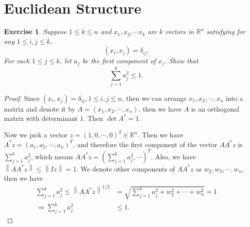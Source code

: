 \documentclass[11pt]{book}
\newtheorem{exercise}{Exercise}[section]
\theoremstyle{definition}
\numberwithin{equation}{subsection}
\begin{document}
\section{Euclidean Structure}
\begin{exercise}
Suppose $1\leq k\leq n$ and $x_{1},x_{2},\cdots x_{k}$ are $k$ vectors
in $\mathbb{R}^{n}$ satisfying for any $1\leq i,j\leq k$,%
$$
\left(  x_{i},x_{j}\right)  =\delta_{ij}.
$$
For each $1\leq j\leq k$, let $a_{j}$ be the first component of $x_{j}$. Show
that%
$$
\sum_{j=1}^{k}a_{j}^{2}\leq1.
$$
\end{exercise}
\begin{proof}
Since $(x_i,x_j) = \delta_{ij}, 1\leq i,j\leq n$, then we can arrange $x_1, x_2,\cdots, x_n$ into a matrix and denote it by $A = (x_1, x_2,\cdots, x_n)$, then we have $A$ is an orthogonal matrix with determinant $1$. Then $\det A^* = 1$. 

Now we pick a vector $z = (1,0,\cdots,0)^T \in \mathbb{R}^{n}$. Then we have $A^*z = (a_1, a_2, \cdots, a_n)^T$, and therefore the first component of the vector $AA^*z$ is $\sum_{j=1}^{k}a_{j}^{2}$, which means $AA^*z = \left(\sum_{j=1}^{k}a_{j}^{2}, \cdots \right)^T$. Also, we have $\left\|AA^*z \right\| \leq \left\| I z \right\| = 1$. We denote other components of $AA^*z$ as $w_2, w_3, \cdots, w_n$, then we have 
\begin{align*}
    \sum_{j=1}^{k}a_{j}^{2} \leq \left\|AA^*z \right\|^{1/2} & = \sqrt{\sum_{j=1}^{k}a_{j}^{2} + w_2^2 + \cdots + w_n^2} = 1 \\
    \Rightarrow \sum_{j=1}^{k}a_{j}^{2} & \leq 1.
\end{align*}
\end{proof}

\medskip
\end{document}
